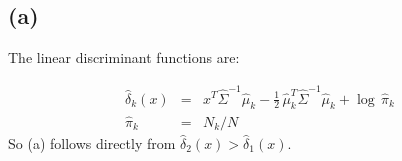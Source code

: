 

\subsection*{(a)}

The linear discriminant functions are:

\begin{eqnarray*}
    \hat{\delta}_k(x) & = & x^T \hat{\Sigma}^{-1} \hat{\mu}_k - \frac{1}{2}\, \hat{\mu}_k ^T \hat{\Sigma}^{-1}  \hat{\mu}_k + \log\, \hat{\pi}_k \\
    \hat{\pi}_k & = & N_k / N
\end{eqnarray*}
So (a) follows directly from $\hat{\delta}_2(x) > \hat{\delta}_1(x)$. 


